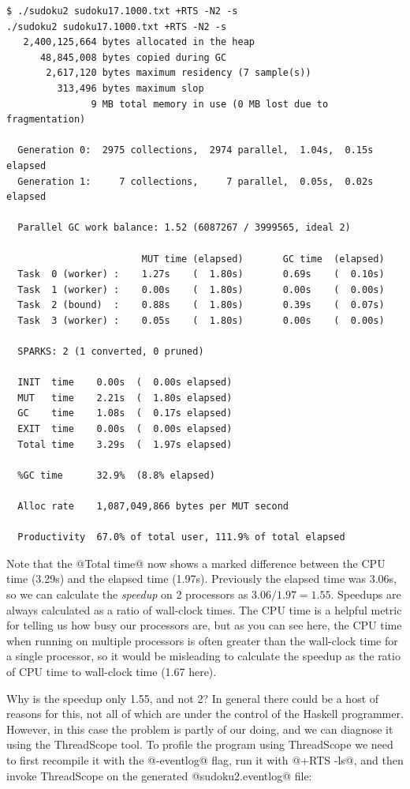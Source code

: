 {\small
\begin{verbatim}
$ ./sudoku2 sudoku17.1000.txt +RTS -N2 -s
./sudoku2 sudoku17.1000.txt +RTS -N2 -s 
   2,400,125,664 bytes allocated in the heap
      48,845,008 bytes copied during GC
       2,617,120 bytes maximum residency (7 sample(s))
         313,496 bytes maximum slop
               9 MB total memory in use (0 MB lost due to fragmentation)

  Generation 0:  2975 collections,  2974 parallel,  1.04s,  0.15s elapsed
  Generation 1:     7 collections,     7 parallel,  0.05s,  0.02s elapsed

  Parallel GC work balance: 1.52 (6087267 / 3999565, ideal 2)

                        MUT time (elapsed)       GC time  (elapsed)
  Task  0 (worker) :    1.27s    (  1.80s)       0.69s    (  0.10s)
  Task  1 (worker) :    0.00s    (  1.80s)       0.00s    (  0.00s)
  Task  2 (bound)  :    0.88s    (  1.80s)       0.39s    (  0.07s)
  Task  3 (worker) :    0.05s    (  1.80s)       0.00s    (  0.00s)

  SPARKS: 2 (1 converted, 0 pruned)

  INIT  time    0.00s  (  0.00s elapsed)
  MUT   time    2.21s  (  1.80s elapsed)
  GC    time    1.08s  (  0.17s elapsed)
  EXIT  time    0.00s  (  0.00s elapsed)
  Total time    3.29s  (  1.97s elapsed)

  %GC time      32.9%  (8.8% elapsed)

  Alloc rate    1,087,049,866 bytes per MUT second

  Productivity  67.0% of total user, 111.9% of total elapsed
\end{verbatim}}

Note that the @Total time@ now shows a marked difference between the
CPU time (3.29s) and the elapsed time (1.97s).  Previously the elapsed
time was 3.06s, so we can calculate the \emph{speedup} on 2 processors
as $3.06/1.97 = 1.55$.  Speedups are always calculated as a ratio of
wall-clock times.  The CPU time is a helpful metric for telling us how
busy our processors are, but as you can see here, the CPU time when
running on multiple processors is often greater than the wall-clock
time for a single processor, so it would be misleading to calculate
the speedup as the ratio of CPU time to wall-clock time (1.67 here).

Why is the speedup only 1.55, and not 2?  In general there could be a
host of reasons for this, not all of which are under the control of
the Haskell programmer.  However, in this case the problem is partly
of our doing, and we can diagnose it using the ThreadScope tool.  To
profile the program using ThreadScope we need to first recompile it
with the @-eventlog@ flag, run it with @+RTS -ls@, and then invoke
ThreadScope on the generated @sudoku2.eventlog@ file:

